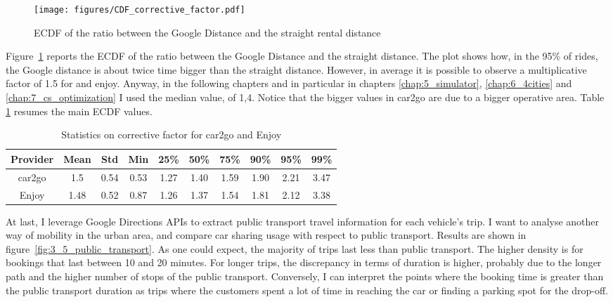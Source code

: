 \begin{figure}[h!]
	\centering
	\texttt{[image: figures/CDF\_corrective\_factor.pdf]}
	\caption{ECDF of the ratio between the Google Distance and the straight rental distance \label{fig:3_5_cdf_corrective_factors}}
\end{figure}


Figure~\ref{fig:3_5_cdf_corrective_factors} reports the ECDF of the ratio between the Google Distance and the straight distance. The plot shows how, in the 95\% of rides, the Google distance is about twice time bigger than the straight distance. However, in average it is possible to observe a multiplicative factor of 1.5 for and enjoy. Anyway, in the following chapters and in particular in chapters \ref{chap:5_simulator}, \ref{chap:6_4cities} and \ref{chap:7_cs_optimization} I used the median value, of 1,4. Notice that the bigger values in car2go are due to a bigger operative area. Table \ref{tab:3_5_corrective_factor} resumes the main ECDF values.

\begin{table}[h!]
	\centering
	\caption{Statistics on corrective factor for car2go and Enjoy}
	\begin{tabular}{|c|c|c|c|c|c|c|c|c|c|}
		
		\hline
		\textbf{Provider} & \textbf{Mean} & \textbf{Std} & \textbf{Min} & \textbf{25\%} & \textbf{50\%} & \textbf{75\%} & \textbf{90\%} & \textbf{95\%} & \textbf{99\%} \\ \hline
		car2go            & 1.5           & 0.54         & 0.53         & 1.27          & 1.40          & 1.59          & 1.90          & 2.21          & 3.47          \\ \hline
		Enjoy             & 1.48          & 0.52         & 0.87         & 1.26          & 1.37          & 1.54          & 1.81          & 2.12          & 3.38          \\ \hline

	\end{tabular}
	\label{tab:3_5_corrective_factor}
\end{table}


At last, I leverage Google Directions APIs to extract public transport travel information for each vehicle's trip. I want to analyse another way of mobility in the urban area, and compare car sharing usage with respect to public transport. Results are shown in figure~\ref{fig:3_5_public_transport}.
As one could expect, the majority of trips last less than public transport. The higher density is for bookings that last between 10 and 20 minutes. For longer trips, the discrepancy in terms of duration is higher, probably due to the longer path and the higher number of stops of the public transport. Conversely, I can interpret the points where the booking time is greater than  the public transport duration as trips where the customers spent a lot of time in reaching the car or finding a parking spot for the drop-off.


